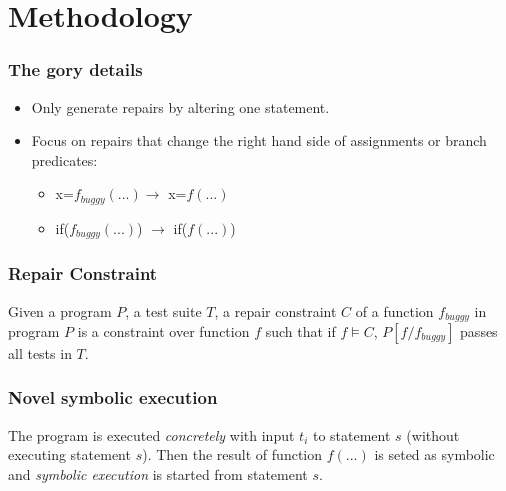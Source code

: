 \documentclass{beamer}
\begin{document}
  \section*{Methodology}
  \frame
  {
    \frametitle{The gory details}
    \begin{itemize}
     \item Only generate repairs by altering one statement.

     \item Focus on repairs that change the right
hand side of assignments or branch predicates:
     \begin{itemize}
      \item x=$f_{buggy}(...) \rightarrow$ x=$f(...)$
      \item if($f_{buggy}(...)$) $\rightarrow$ if($f(...)$)
     \end{itemize}
    \end{itemize}

  }
  \frame
  {
    \frametitle{Repair Constraint}
     Given a program $P$, a
test suite $T$, a repair constraint $C$ of a function $f_{buggy}$ in
program $P$ is a constraint over function $f$ such that if $f\vDash C$,
$P[f/f_{buggy}]$ passes all tests in $T$.
  }
  \frame
  {
    \frametitle{Novel symbolic execution}
    
    The program is executed \textit{concretely} with input $t_i$
to statement $s$ (without
executing statement $s$). Then the result of function
$f(...)$ is seted as symbolic and \textit{symbolic execution} is started from
statement $s$.
  }
  
\end{document}
